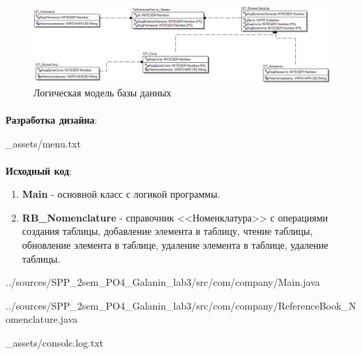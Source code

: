 \documentclass[12pt, a4paper, simple]{eskdtext}
\begin{document}
    \begin{figure}[!h]
        \centering
        \includegraphics[width=16cm]
            {../sources/database/ФМ.png}
        \caption{Логическая модель базы данных}
    \end{figure}


    \paragraph{} \textbf{Разработка дизайна}:


    
    {_assets/menu.txt}

    \paragraph{} \textbf{Исходный код}: 

    \begin{enumerate}
        \item \textbf{Main} - основной класс с логикой программы.
        \item \textbf{RB\_Nomenclature} - справочник <<Номенклатура>> с операциями создания таблицы,
        добавление элемента в таблицу,
        чтение таблицы,
        обновление элемента в таблице,
        удаление элемента в таблице,
        удаление таблицы.
    \end{enumerate}

    
    {../sources/SPP_2sem_PO4_Galanin_lab3/src/com/company/Main.java}

    
    {../sources/SPP_2sem_PO4_Galanin_lab3/src/com/company/ReferenceBook_Nomenclature.java}

    
    {_assets/console.log.txt}
\end{document}
